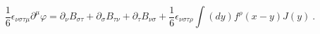 \begin{equation}
\frac{1}{6}\epsilon _{\nu \sigma \tau \mu }\partial ^{\mu }\varphi =\partial
_{\nu }B_{\sigma \tau }+\partial _{\sigma }B_{\tau \nu }+\partial _{\tau
}B_{\nu \sigma }+\frac{1}{6}\epsilon _{\nu \sigma \tau \rho }\int
(dy)f^{\rho }(x-y)J(y)\ .
\end{equation}%

